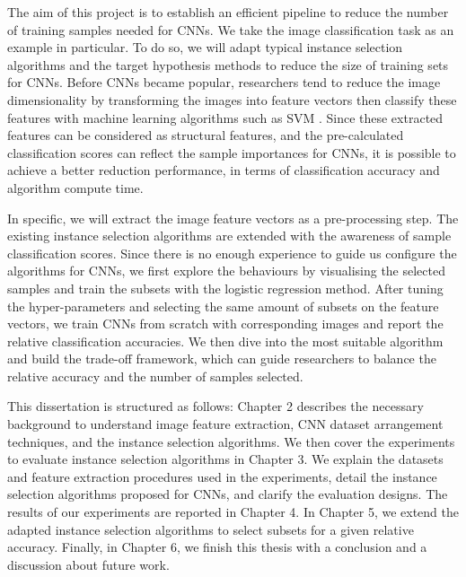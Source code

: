 The aim of this project is to establish an efficient pipeline to reduce the number of training samples needed for CNNs. We take the image classification task as an example in particular. To do so, we will adapt typical instance selection algorithms and the target hypothesis methods to reduce the size of training sets for CNNs. Before CNNs became popular, researchers tend to reduce the image dimensionality by transforming the images into feature vectors then classify these features with machine learning algorithms such as SVM \cite{Popovici2003, Csurka2004}. Since these extracted features can be considered as structural features, and the pre-calculated classification scores can reflect the sample importances for CNNs, it is possible to achieve a better reduction performance, in terms of classification accuracy and algorithm compute time. 

In specific, we will extract the image feature vectors as a pre-processing step. The existing instance selection algorithms are extended with the awareness of sample classification scores. Since there is no enough experience to guide us configure the algorithms for CNNs, we first explore the behaviours by visualising the selected samples and train the subsets with the logistic regression method. After tuning the hyper-parameters and selecting the same amount of subsets on the feature vectors, we train CNNs from scratch with corresponding images and report the relative classification accuracies. We then dive into the most suitable algorithm and build the trade-off framework, which can guide researchers to balance the relative accuracy and the number of samples selected. 

This dissertation is structured as follows: Chapter 2 describes the necessary background to understand image feature extraction, CNN dataset arrangement techniques, and the instance selection algorithms. We then cover the experiments to evaluate instance selection algorithms in Chapter 3. We explain the datasets and feature extraction procedures used in the experiments, detail the instance selection algorithms proposed for CNNs, and clarify the evaluation designs. The results of our experiments are reported in Chapter 4. In Chapter 5, we extend the adapted instance selection algorithms to select subsets for a given relative accuracy. Finally, in Chapter 6, we finish this thesis with a conclusion and a discussion about future work.



